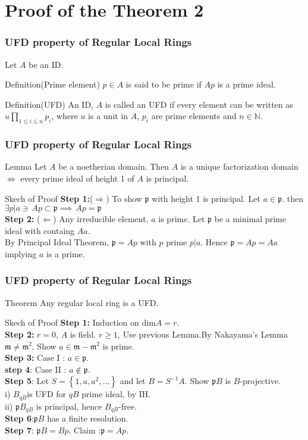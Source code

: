 \documentclass[
	11pt, %
]{beamer}
\newcommand{\N}{\mathbb{N}}                         %
\newcommand{\B}{\textbf}						%
\newcommand{\Ra}{\Rightarrow}
\newcommand{\La}{\Leftarrow}
\newcommand{\mf}{\mathfrak}
\newcommand{\lda}{\Longleftrightarrow} 	%
\begin{document}
\section{Proof of the Theorem 2}

\begin{frame}
\frametitle{UFD property of Regular Local Rings}
Let $A$ be an ID. 
\begin{block}{Definition(Prime element)}
    $p\in A$  is said to be prime if $Ap$ is a prime ideal.
\end{block}
\begin{block}{Definition(UFD)}
    An ID, $A$ is called an UFD if every element can be written as
$u\prod_{1\leq i\leq n} p_i$, where $u$ is a unit in $A$, $p_i$ are prime elements and $n \in \N$.
\end{block}
 \end{frame}
\begin{frame}
\frametitle{UFD property of Regular Local Rings}
\begin{block}{ Lemma }
   Let $A$ be a noetherian domain. Then $A$ is a unique factorization domain $\lda$ every prime ideal of height 1 of $A$ is principal.
\end{block}
\pause
\begin{block}{Skech of Proof}
\B{Step 1:}($\Ra$) To show $\mf{p}$ with height 1 is principal. Let $a\in \mf{p}$. then $\exists p|a\ni \,Ap \subset \mf{p}\implies\, Ap = \mf{p}$
\\
\B{Step 2:} ($\La$) Any irreducible element, $a$ is prime. Let $\mf{p}$ be a minimal prime ideal with containg $A a$.\\
By Principal Ideal Theorem, $\mathfrak{p}=A p$ with $p$ prime $p|a$. Hence $\mf{p} =Ap = Aa$ implying $a$ is a prime.
\end{block}
\end{frame}
\begin{frame}
\frametitle{UFD property of Regular Local Rings}
\small{
\begin{block}{ Theorem }
   Any regular local ring is a UFD.
\end{block}
\pause
\begin{block}{Skech of Proof}
\B{Step 1:} Induction on dim$A= r$.
\\
\B{Step 2:} $r = 0$, $A$ is field. $r\geq 1$, Use previous Lemma.By Nakayama's Lemma $\mf{m} \neq {\mf{m}}^2$. Show $a \in \mathfrak{m}-\mathfrak{m}^{2}$ is prime.
\\
\B{Step 3:} Case I : $a\in\mf{p}$. 
\\
\B{step 4}: Case II : $a\notin\mf{p}$.
\\
\B{Step 5}: Let $S=\left\{1, a, a^{2}, \ldots\right\}$ and let $B=S^{-1} A$. Show $\mf{p}B$ is $B$-projective.
\\
i) $B_{qB}$is UFD for $qB$ prime ideal, by IH.
\\
ii) $\mf{p} B_{qB}$ is principal, hence $B_{qB}$-free.
\\
\B{Step 6}:$\mf{p}B$ has a finite resolution.
\\
\B{Step 7}: $\mf{p}B = Bp$. Claim :$\mf{p} = Ap$. 
\end{block}
}
\end{frame}
\end{document}
